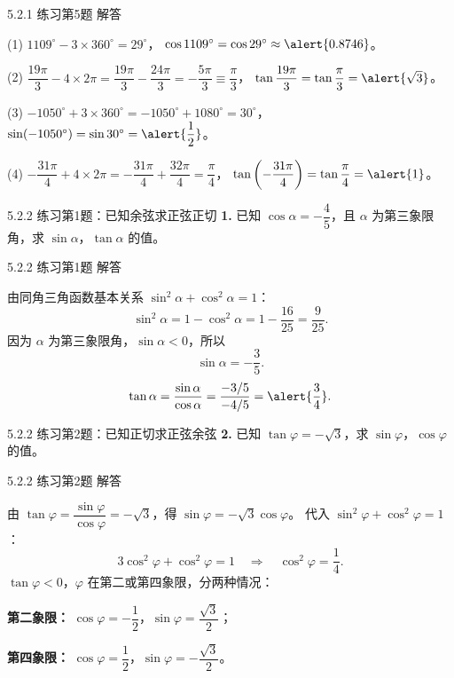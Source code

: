 \documentclass[10pt,aspectratio=169,serif]{beamer}
\begin{document}
\begin{frame}[t]{5.2.1 练习第5题 解答}
\begin{tcolorbox}[colback=orange!10,colframe=orange,title=\textbf{解}]
(1) $1109^\circ - 3\times 360^\circ = 29^\circ$，
$\cos 1109^\circ = \cos 29^\circ \approx \alert{0.8746}$。

(2) $\dfrac{19\pi}{3} - 4\times 2\pi = \dfrac{19\pi}{3}-\dfrac{24\pi}{3}=-\dfrac{5\pi}{3}\equiv\dfrac{\pi}{3}$，
$\tan\dfrac{19\pi}{3}=\tan\dfrac{\pi}{3}=\alert{\sqrt{3}}$。

(3) $-1050^\circ + 3\times 360^\circ = -1050^\circ+1080^\circ=30^\circ$，
$\sin(-1050^\circ)=\sin 30^\circ=\alert{\dfrac{1}{2}}$。

(4) $-\dfrac{31\pi}{4}+4\times 2\pi=-\dfrac{31\pi}{4}+\dfrac{32\pi}{4}=\dfrac{\pi}{4}$，
$\tan\left(-\dfrac{31\pi}{4}\right)=\tan\dfrac{\pi}{4}=\alert{1}$。
\end{tcolorbox}
\end{frame}

\begin{frame}[t]{5.2.2 练习第1题：已知余弦求正弦正切}
\textbf{1.} 已知 $\cos\alpha=-\dfrac{4}{5}$，且 $\alpha$ 为第三象限角，求 $\sin\alpha$，$\tan\alpha$ 的值。
\end{frame}

\begin{frame}[t]{5.2.2 练习第1题 解答}
\begin{tcolorbox}[colback=orange!10,colframe=orange,title=\textbf{解}]
由同角三角函数基本关系 $\sin^2\alpha+\cos^2\alpha=1$：
\[
\sin^2\alpha = 1-\cos^2\alpha = 1-\frac{16}{25} = \frac{9}{25}.
\]
因为 $\alpha$ 为第三象限角，$\sin\alpha<0$，所以
\[
\sin\alpha = -\frac{3}{5}.
\]
\[
\tan\alpha = \frac{\sin\alpha}{\cos\alpha} = \frac{-3/5}{-4/5} = \alert{\frac{3}{4}}.
\]
\end{tcolorbox}
\end{frame}

\begin{frame}[t]{5.2.2 练习第2题：已知正切求正弦余弦}
\textbf{2.} 已知 $\tan\varphi=-\sqrt{3}$，求 $\sin\varphi$，$\cos\varphi$ 的值。
\end{frame}

\begin{frame}[t]{5.2.2 练习第2题 解答}
\begin{tcolorbox}[colback=orange!10,colframe=orange,title=\textbf{解}]
由 $\tan\varphi=\dfrac{\sin\varphi}{\cos\varphi}=-\sqrt{3}$，得 $\sin\varphi=-\sqrt{3}\cos\varphi$。
代入 $\sin^2\varphi+\cos^2\varphi=1$：
\[
3\cos^2\varphi+\cos^2\varphi=1 \quad\Longrightarrow\quad \cos^2\varphi=\frac{1}{4}.
\]
$\tan\varphi<0$，$\varphi$ 在第二或第四象限，分两种情况：

\vspace{0.3em}
\textbf{第二象限：} $\cos\varphi=-\dfrac{1}{2}$，$\sin\varphi=\dfrac{\sqrt{3}}{2}$；

\textbf{第四象限：} $\cos\varphi=\dfrac{1}{2}$，$\sin\varphi=-\dfrac{\sqrt{3}}{2}$。
\end{tcolorbox}
\end{frame}
\end{document}
